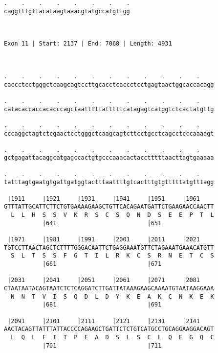 \documentclass{article}
\begin{document}
\begin{Verbatim}
.    .    .    .    .    .    .    .
caggtttgttacataagtaaacgtatgccatgttgg
                                    
                                    
 
Exon 11 | Start: 2137 | End: 7068 | Length: 4931



.    .    .    .    .    .    .    .    .    .    .    .    
caccctcctgggctcaagcagtccttgcacctcaccctcctgagtaactggcaccacagg
                                                            
.    .    .    .    .    .    .    .    .    .    .    .    
catacaccaccacacccagctaatttttatttttcatagagtcatggtctcactatgttg
                                                            
.    .    .    .    .    .    .    .    .    .    .    .    
cccaggctagtctcgaactcctgggctcaagcagtcttcctgcctcagcctcccaaaagt
                                                            
.    .    .    .    .    .    .    .    .    .    .    .    
gctgagattacaggcatgagccactgtgcccaaacactacctttttaacttagtgaaaaa
                                                            
.    .    .    .    .    .    .    .    .    .    .    .    
tatttagtgaatgtgattgatggtactttaattttgtcactttgtgtttttatgtttagg
                                                            
 |1911     |1921     |1931     |1941     |1951     |1961    
GTTTATTGCATTCTTCTGTGAAAAGAAGCTGTTCACAGAATGATTCTGAAGAACCAACTT
  L  L  H  S  S  V  K  R  S  C  S  Q  N  D  S  E  E  P  T  L
           |641                          |651               
  
 |1971     |1981     |1991     |2001     |2011     |2021    
TGTCCTTAACTAGCTCTTTTGGGACAATTCTGAGGAAATGTTCTAGAAATGAAACATGTT
  S  L  T  S  S  F  G  T  I  L  R  K  C  S  R  N  E  T  C  S
           |661                          |671               
  
 |2031     |2041     |2051     |2061     |2071     |2081    
CTAATAATACAGTAATCTCTCAGGATCTTGATTATAAAGAAGCAAAATGTAATAAGGAAA
  N  N  T  V  I  S  Q  D  L  D  Y  K  E  A  K  C  N  K  E  K
           |681                          |691               
  
 |2091     |2101     |2111     |2121     |2131     |2141    
AACTACAGTTATTTATTACCCCAGAAGCTGATTCTCTGTCATGCCTGCAGGAAGGACAGT
  L  Q  L  F  I  T  P  E  A  D  S  L  S  C  L  Q  E  G  Q  C
           |701                          |711               
  

\end{Verbatim}
\end{document}
